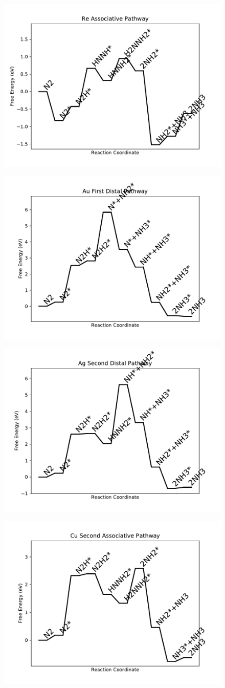 \begin{figure}
\includegraphics[width=0.5\linewidth]{data/plots/Re_associative.pdf}
\label{fig:Re_associative}
\end{figure}

\begin{figure}
\includegraphics[width=0.5\linewidth]{data/plots/Au_distal_1.pdf}
\label{fig:Au_distal_1}
\end{figure}

\begin{figure}
\includegraphics[width=0.5\linewidth]{data/plots/Ag_distal_2.pdf}
\label{fig:Ag_distal_2}
\end{figure}

\begin{figure}
\includegraphics[width=0.5\linewidth]{data/plots/Cu_associative_2.pdf}
\label{fig:Cu_associative_2}
\end{figure}

